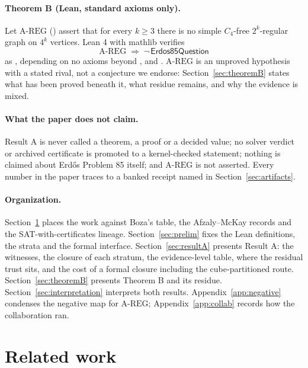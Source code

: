 \documentclass{anvil-paper}
\newcommand{\AREG}{\mathrm{A\text{-}REG}}
\newcommand{\Qn}{\textsf{Erdos85Question}}
\theoremstyle{definition}
\begin{document}
\paragraph{Theorem B (Lean, standard axioms only).} Let $\AREG$ () assert that for every $k\ge 3$ there is no simple $C_4$-free $2^k$-regular graph on $4^k$ vertices. Lean 4 \citep{moura2021lean4} with mathlib \citep{mathlib2020} verifies
\[
\AREG \;\Rightarrow\; \neg\,\Qn
\]
as , depending on no axioms beyond ,  and . $\AREG$ is an unproved hypothesis with a stated rival, not a conjecture we endorse: Section~\ref{sec:theoremB} states what has been proved beneath it, what residue remains, and why the evidence is mixed.

\paragraph{What the paper does not claim.} Result A is never called a theorem, a proof or a decided value; no solver verdict or archived certificate is promoted to a kernel-checked statement; nothing is claimed about Erdős Problem 85 itself; and $\AREG$ is not asserted. Every number in the paper traces to a banked receipt named in Section~\ref{sec:artifacts}.

\paragraph{Organization.} Section~\ref{sec:related} places the work against Boza's table, the Afzaly--McKay records and the SAT-with-certificates lineage. Section~\ref{sec:prelim} fixes the Lean definitions, the strata and the formal interface. Section~\ref{sec:resultA} presents Result A: the witnesses, the closure of each stratum, the evidence-level table, where the residual trust sits, and the cost of a formal closure including the cube-partitioned route. Section~\ref{sec:theoremB} presents Theorem B and its residue. Section~\ref{sec:interpretation} interprets both results. Appendix~\ref{app:negative} condenses the negative map for $\AREG$; Appendix~\ref{app:collab} records how the collaboration ran.

\section{Related work}\label{sec:related}
\end{document}
